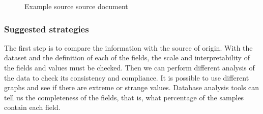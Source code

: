 \begin{figure}[ht]
    \centering
    \caption{Example source source document}
\end{figure}

\subsubsection*{Suggested strategies} 

The first step is to compare the information with the source of origin. With the dataset and the definition
of each of the fields, the scale and interpretability of the fields and values must be checked.
Then we can perform different analysis of the data to check its consistency and compliance.
It is possible to use different graphs and see if there are extreme or strange values.
Database analysis tools can tell us the completeness of the fields, that is, what percentage of the
samples contain each field.

